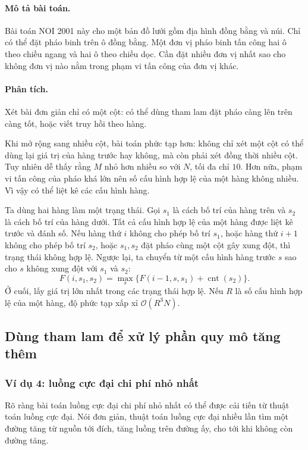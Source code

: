 \documentclass[11pt]{article}
\newcommand{\Oh}{\mathcal{O}}
\begin{document}
\paragraph{Mô tả bài toán.}
Bài toán NOI 2001 này cho một bản đồ lưới gồm địa hình đồng bằng và núi. Chỉ
có thể đặt pháo binh trên ô đồng bằng. Một đơn vị pháo binh tấn công hai ô
theo chiều ngang và hai ô theo chiều dọc. Cần đặt nhiều đơn vị nhất sao cho
không đơn vị nào nằm trong phạm vi tấn công của đơn vị khác.

\paragraph{Phân tích.}
Xét bài đơn giản chỉ có một cột: có thể dùng tham lam đặt pháo càng lên trên
càng tốt, hoặc viết truy hồi theo hàng.

Khi mở rộng sang nhiều cột, bài toán phức tạp hơn: không chỉ xét một cột có
thể dùng lại giá trị của hàng trước hay không, mà còn phải xét đồng thời nhiều
cột. Tuy nhiên dễ thấy rằng $M$ nhỏ hơn nhiều so với $N$, tối đa chỉ $10$.
Hơn nữa, phạm vi tấn công của pháo khá lớn nên số cấu hình hợp lệ của một
hàng không nhiều. Vì vậy có thể liệt kê các cấu hình hàng.

Ta dùng hai hàng làm một trạng thái. Gọi $s_1$ là cách bố trí của hàng trên
và $s_2$ là cách bố trí của hàng dưới. Tất cả cấu hình hợp lệ của một hàng
được liệt kê trước và đánh số. Nếu hàng thứ $i$ không cho phép bố trí $s_1$,
hoặc hàng thứ $i+1$ không cho phép bố trí $s_2$, hoặc $s_1,s_2$ đặt pháo cùng
một cột gây xung đột, thì trạng thái không hợp lệ. Ngược lại, ta chuyển từ
một cấu hình hàng trước $s$ sao cho $s$ không xung đột với $s_1$ và $s_2$:
\[
  F(i,s_1,s_2)=
  \max_s\{F(i-1,s,s_1)+\operatorname{cnt}(s_2)\}.
\]
Ở cuối, lấy giá trị lớn nhất trong các trạng thái hợp lệ. Nếu $R$ là số cấu
hình hợp lệ của một hàng, độ phức tạp xấp xỉ $\Oh(R^3N)$.

\subsection{Dùng tham lam để xử lý phần quy mô tăng thêm}

\subsubsection{Ví dụ 4: luồng cực đại chi phí nhỏ nhất}

Rõ ràng bài toán luồng cực đại chi phí nhỏ nhất có thể được cải tiến từ thuật
toán luồng cực đại. Nói đơn giản, thuật toán luồng cực đại nhiều lần tìm một
đường tăng từ nguồn tới đích, tăng luồng trên đường ấy, cho tới khi không còn
đường tăng.
\end{document}
